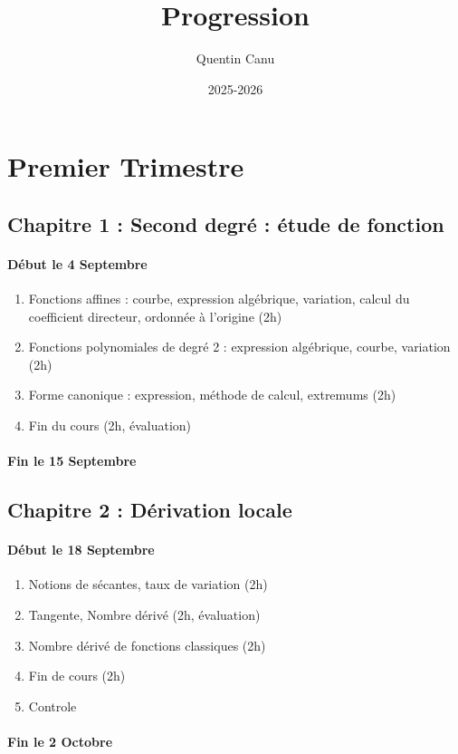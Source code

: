 \documentclass{article}
\title{Progression}
\author{Quentin Canu}
\date{2025-2026}
\begin{document}
\maketitle
\section{Premier Trimestre}
\subsection*{Chapitre 1 : Second degré : étude de fonction}
\paragraph*{Début le 4 Septembre}
\begin{enumerate}
\item Fonctions affines : courbe, expression algébrique, variation, calcul du coefficient directeur, ordonnée à l'origine (2h)
\item Fonctions polynomiales de degré 2 : expression algébrique, courbe, variation (2h)
\item Forme canonique : expression, méthode de calcul, extremums (2h)
\item Fin du cours (2h, évaluation)
\end{enumerate}
\paragraph*{Fin le 15 Septembre}
\subsection*{Chapitre 2 : Dérivation locale}
\paragraph*{Début le 18 Septembre}
\begin{enumerate}
\item Notions de sécantes, taux de variation (2h)
\item Tangente, Nombre dérivé (2h, évaluation)
\item Nombre dérivé de fonctions classiques (2h)
\item Fin de cours (2h)
\item Controle 
\end{enumerate}
\paragraph*{Fin le 2 Octobre}
\end{document}
